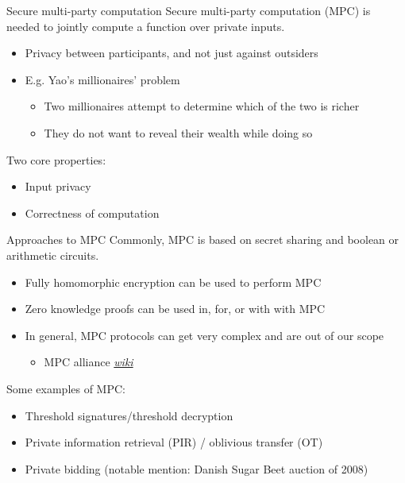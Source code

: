\begin{frame}{Secure multi-party computation}
  Secure multi-party computation (MPC) is needed to jointly compute a function over private inputs.
  \begin{itemize}[<+(1)->]
    \item Privacy between participants, and not just against outsiders
    \item E.g. Yao's millionaires' problem
    \par
    \begin{itemize}
      \item Two millionaires attempt to determine which of the two is richer
      \item They do not want to reveal their wealth while doing so
    \end{itemize}
  \end{itemize}

  \pause
  Two core properties:
  \begin{itemize}[<+(1)->]
    \item Input privacy
    \item Correctness of computation
  \end{itemize}
\end{frame}

\begin{frame}{Approaches to MPC}
  Commonly, MPC is based on secret sharing and boolean or arithmetic circuits.
  \begin{itemize}[<+(1)->]
    \item Fully homomorphic encryption can be used to perform MPC
    \item Zero knowledge proofs can be used in, for, or with with MPC
    \item In general, MPC protocols can get very complex and are out of our scope
    \par
    \begin{itemize}
      \item MPC alliance \href{https://web.archive.org/web/20240720125512/https://wiki.mpcalliance.org/protocols.html}{\textit{wiki}}
    \end{itemize}
  \end{itemize}

  \vspace*{1em}

  \pause
  Some examples of MPC:
  \begin{itemize}[<+(1)->]
    \item Threshold signatures/threshold decryption
    \item Private information retrieval (PIR) / oblivious transfer (OT)
    \item Private bidding (notable mention: Danish Sugar Beet auction of 2008)
  \end{itemize}
\end{frame}

